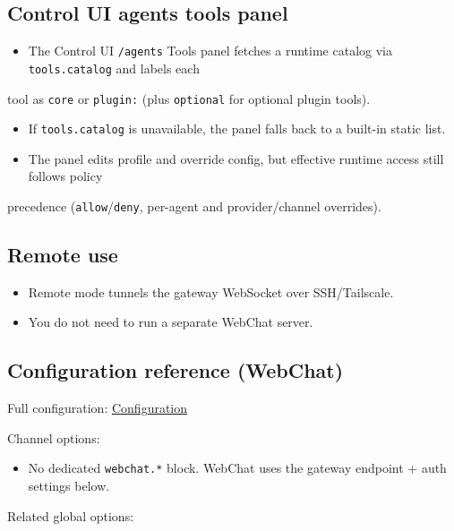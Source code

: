 \subsection{Control UI agents tools panel}


\begin{itemize}
  \item The Control UI \texttt{/agents} Tools panel fetches a runtime catalog via \texttt{tools.catalog} and labels each
\end{itemize}

tool as \texttt{core} or \texttt{plugin:} (plus \texttt{optional} for optional plugin tools).
\begin{itemize}
  \item If \texttt{tools.catalog} is unavailable, the panel falls back to a built-in static list.
  \item The panel edits profile and override config, but effective runtime access still follows policy
\end{itemize}

precedence (\texttt{allow}/\texttt{deny}, per-agent and provider/channel overrides).

\subsection{Remote use}


\begin{itemize}
  \item Remote mode tunnels the gateway WebSocket over SSH/Tailscale.
  \item You do not need to run a separate WebChat server.
\end{itemize}


\subsection{Configuration reference (WebChat)}


Full configuration: \href{/gateway/configuration}{Configuration}

Channel options:

\begin{itemize}
  \item No dedicated \texttt{webchat.*} block. WebChat uses the gateway endpoint + auth settings below.
\end{itemize}


Related global options:

